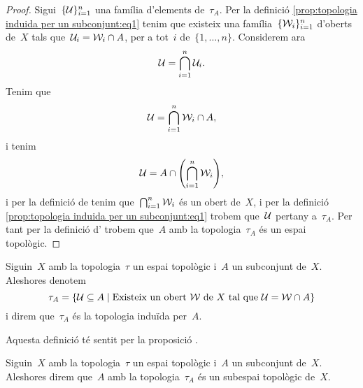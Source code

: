 \documentclass[../../main.tex]{subfiles}
\begin{document}
\begin{proposition}
\begin{proof}
            Sigui~\(\{\mathcal{U}\}_{i=1}^{n}\) una família d'elements de~\(\tau_{A}\).
            Per la definició \eqref{prop:topologia induida per un subconjunt:eq1} tenim que existeix una família~\(\{\mathcal{W}_{i}\}_{i=1}^{n}\) d'oberts de~\(X\) tals que~\(\mathcal{U}_{i}=\mathcal{W}_{i}\cap A\), per a tot~\(i\) de~\(\{1,\dots,n\}\).
            Considerem ara
            \[
                \mathcal{U}=\bigcap_{i=1}^{n}\mathcal{U}_{i}.
            \]
            Tenim que
            \[
                \mathcal{U}=\bigcap_{i=1}^{n}\mathcal{W}_{i}\cap A,
            \]
            i tenim
            \[
                \obert{U}=A\cap\left(\bigcap_{i=1}^{n}\obert{W}_{i}\right),
            \]
            i per la definició de  tenim que~\(\bigcap_{i=1}^{n}\mathcal{W}_{i}\) és un obert de~\(X\), i per la definició \eqref{prop:topologia induida per un subconjunt:eq1} trobem que~\(\mathcal{U}\) pertany a~\(\tau_{A}\).
            Per tant per la definició d' trobem que~\(A\) amb la topologia~\(\tau_{A}\) és un espai topològic.
        \end{proof}
    \end{proposition}
    \begin{definition}
        \label{def:topologia induida per un subconjunt}
        Siguin~\(X\) amb la topologia~\(\tau\) un espai topològic i~\(A\) un subconjunt de~\(X\).
        Aleshores denotem
        \[
            \tau_{A}=\{\mathcal{U}\subseteq A\mid\text{Existeix un obert }\mathcal{W}\text{ de }X\text{ tal que }\mathcal{U}=\mathcal{W}\cap A\}
        \]
        i direm que~\(\tau_{A}\) és la topologia induïda per~\(A\).

        Aquesta definició té sentit per la proposició .
    \end{definition}
    \begin{definition}
        \label{def:subespai topològic}
        Siguin~\(X\) amb la topologia~\(\tau\) un espai topològic i~\(A\) un subconjunt de~\(X\).
        Aleshores direm que~\(A\) amb la topologia~\(\tau_{A}\) és un subespai topològic de~\(X\).
    \end{definition}
\end{document}
